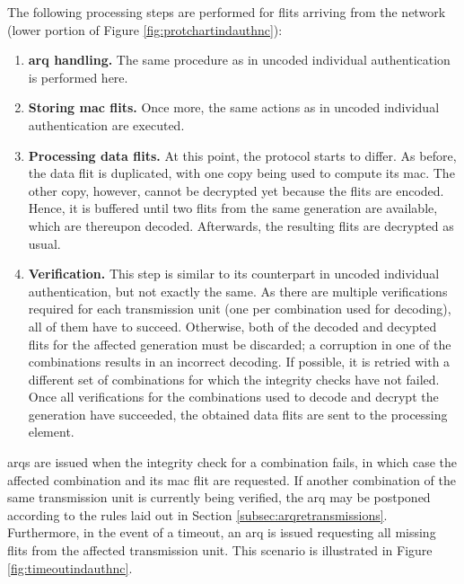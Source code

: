 The following processing steps are performed for flits arriving from the network (lower portion of Figure \ref{fig:protchartindauthnc}):
\begin{enumerate}
    \item \textbf{\Gls{arq} handling.} The same procedure as in uncoded individual authentication is performed here.
    \item \textbf{Storing \gls{mac} flits.} Once more, the same actions as in uncoded individual authentication are executed.
    \item \textbf{Processing data flits.} At this point, the protocol starts to differ. As before, the data flit is duplicated, with one copy being
        used to compute its \gls{mac}. The other copy, however, cannot be decrypted yet because the flits are encoded. Hence, it is buffered until two
        flits from the same generation are available, which are thereupon decoded. Afterwards, the resulting flits are decrypted as usual.
    \item \textbf{Verification.} This step is similar to its counterpart in uncoded individual authentication, but not exactly the same. As there are
        multiple verifications required for each transmission unit (one per combination used for decoding), all of them have to succeed. Otherwise, both of the decoded
        and decypted flits for the affected generation must be discarded; a corruption in one of the combinations results in an incorrect decoding. If
        possible, it is retried with a different set of combinations for which the integrity checks have not failed. Once all verifications for the
        combinations used to decode and decrypt the generation have succeeded, the obtained data flits are sent to the processing element.
\end{enumerate}
\vspace{0.5\baselineskip}

\Glspl{arq} are issued when the integrity check for a combination fails, in which case the affected combination and its \gls{mac} flit are requested.
If another combination of the same transmission unit is currently being verified, the \gls{arq} may be postponed according to the rules laid out in
Section \ref{subsec:arqretransmissions}. Furthermore, in the event of a timeout, an \gls{arq} is issued requesting all missing flits from the affected
transmission unit. This scenario is illustrated in Figure \vref{fig:timeoutindauthnc}.

